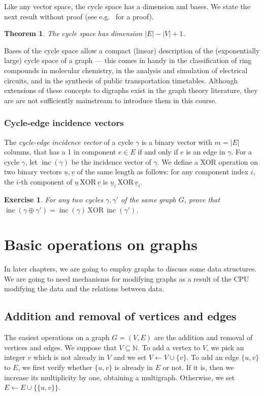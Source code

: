 \documentclass[a4paper]{book}
\theoremstyle{changebreak}                %
\newtheorem{thm}[result]{Theorem}
\newtheorem{ex}[result]{Exercise}
\renewcommand{\vec}[1]{\underline{#1}}
\DeclareMathOperator{\inc}{\mathrm{inc}}
\begin{document}
Like any vector space, the cycle space has a dimension and bases. We
state the next result without proof (see e.g.~\cite{seshu} for a
proof).
\begin{thm}
The cycle space has dimension $|E|-|V|+1$.
\label{thm:cycspdim}
\end{thm}
Bases of the cycle space allow a compact (linear) description of the
(exponentially large) cycle space of a graph --- this comes in handy
in the classification of ring compounds in molecular chemistry, in the
analysis and simulation of electrical circuits, and in the synthesis
of public transportation timetables. Although extensions of these
concepts to digraphs exist in the graph theory literature, they are
are not sufficiently mainstream to introduce them in this
course. 

\subsubsection{Cycle-edge incidence vectors}
The {\it cycle-edge incidence
  vector} of a cycle $\gamma$ is a
binary vector with $m=|E|$ columns, that has a 1
in component $e\in E$ if and only if $e$ is an edge in $\gamma$. For a
cycle $\gamma$, let $\inc({\gamma})$ be the incidence
vector of $\gamma$. We define a XOR
operation on two binary vectors $\vec{u},\vec{v}$ of the same length
as follows: for any component index $i$, the $i$-th component of
$\vec{u}\,\mbox{XOR}\,\vec{v}$ is $\vec{u}_i\,\mbox{XOR}\,\vec{v}_i$.
\begin{ex}
For any two cycles $\gamma,\gamma'$ of the same graph $G$, prove that
$\inc(\gamma\oplus\gamma')=\inc(\gamma)\,\mbox{XOR}\,\inc(\gamma')$. 
\end{ex}

\section{Basic operations on graphs}
\label{s:graph:operation}
In later chapters, we are going to employ graphs to discuss some data
structures. We are going to need mechanisms for modifying graphs as a
result of the CPU modifying the data and the relations between
data. 

\subsection{Addition and removal of vertices and edges}
\label{s:graph:operation:addrem}
The easiest operations on a graph $G=(V,E)$ are
the addition and removal
of vertices and edges. We
suppose that $V\subseteq\mathbb{N}$. To add a vertex to $V$, we pick
an integer $v$ which is not already in $V$ and we set $V\leftarrow
V\cup\{v\}$. To add an edge $\{u,v\}$ to $E$, we first verify whether
$\{u,v\}$ is already in $E$ or not. If it is, then we increase its
multiplicity by one, obtaining a multigraph. Otherwise, we set
$E\leftarrow E\cup\{\{u,v\}\}$.
\end{document}
